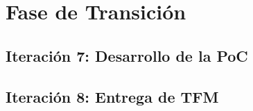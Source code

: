 

\section{Fase de Transición}

\subsection{Iteración 7: Desarrollo de la PoC}



\subsection{Iteración 8: Entrega de TFM}


